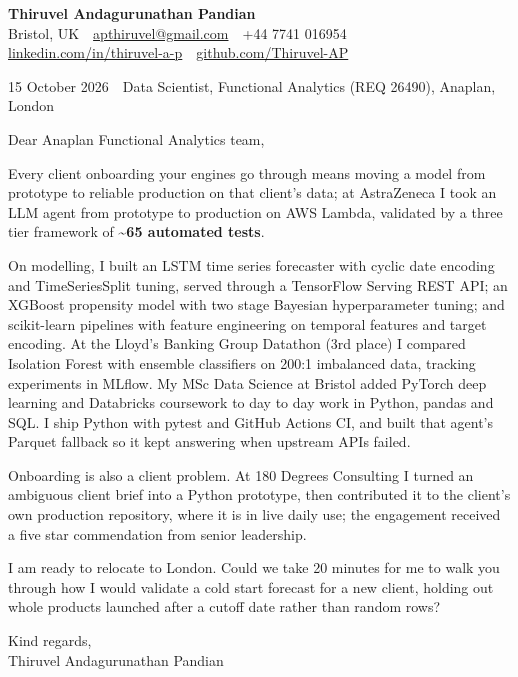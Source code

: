 \documentclass[a4paper,11pt]{article}
\begin{document}
{\fontsize{20}{24}\selectfont\bfseries\color{navy} Thiruvel Andagurunathan Pandian}\\[2pt]
{\small Bristol, UK \,\textperiodcentered\, \href{mailto:apthiruvel@gmail.com}{apthiruvel@gmail.com} \,\textperiodcentered\, +44 7741 016954 \,\textperiodcentered\, \href{https://www.linkedin.com/in/thiruvel-a-p/}{linkedin.com/in/thiruvel-a-p} \,\textperiodcentered\, \href{https://github.com/Thiruvel-AP}{github.com/Thiruvel-AP}}

{\color{muted}\small 15 October 2026 \,\textperiodcentered\, Data Scientist, Functional Analytics (REQ 26490), Anaplan, London}

Dear Anaplan Functional Analytics team,

Every client onboarding your engines go through means moving a model from prototype to reliable production on that client's data; at AstraZeneca I took an LLM agent from prototype to production on AWS Lambda, validated by a three tier framework of \textbf{\textasciitilde65 automated tests}.

On modelling, I built an LSTM time series forecaster with cyclic date encoding and TimeSeriesSplit tuning, served through a TensorFlow Serving REST API; an XGBoost propensity model with two stage Bayesian hyperparameter tuning; and scikit-learn pipelines with feature engineering on temporal features and target encoding. At the Lloyd's Banking Group Datathon (3rd place) I compared Isolation Forest with ensemble classifiers on 200:1 imbalanced data, tracking experiments in MLflow. My MSc Data Science at Bristol added PyTorch deep learning and Databricks coursework to day to day work in Python, pandas and SQL. I ship Python with pytest and GitHub Actions CI, and built that agent's Parquet fallback so it kept answering when upstream APIs failed.

Onboarding is also a client problem. At 180 Degrees Consulting I turned an ambiguous client brief into a Python prototype, then contributed it to the client's own production repository, where it is in live daily use; the engagement received a five star commendation from senior leadership.

I am ready to relocate to London. Could we take 20 minutes for me to walk you through how I would validate a cold start forecast for a new client, holding out whole products launched after a cutoff date rather than random rows?

Kind regards,\\
Thiruvel Andagurunathan Pandian
\end{document}
